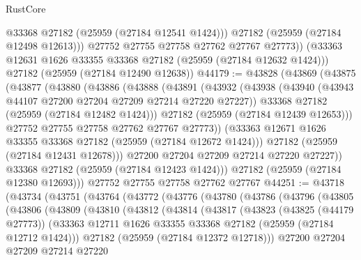 \begin{lexlean}{RustCore}
\begin{coremodule}
            @33368
            @27182
            (@25959 (@27184 @12541 @1424)))
          @27182
          (@25959 (@27184 @12498 @12613)))
        @27752
        @27755
        @27758
        @27762
        @27767
        @27773))
    (@33363 @12631 @1626 @33355 @33368 @27182 (@25959 (@27184 @12632 @1424)))
    @27182
    (@25959 (@27184 @12490 @12638))
@44179 := @43828
    (@43869
      (@43875
        (@43877
          (@43880
            (@43886
              (@43888
                (@43891
                  (@43932
                    (@43938
                      (@43940 (@43943 @44107 @27200 @27204 @27209 @27214 @27220 @27227))
                      @33368
                      @27182
                      (@25959 (@27184 @12482 @1424)))
                    @27182
                    (@25959 (@27184 @12439 @12653)))
                  @27752
                  @27755
                  @27758
                  @27762
                  @27767
                  @27773))
              (@33363 @12671 @1626 @33355 @33368 @27182 (@25959 (@27184 @12672 @1424)))
              @27182
              (@25959 (@27184 @12431 @12678)))
            @27200
            @27204
            @27209
            @27214
            @27220
            @27227))
        @33368
        @27182
        (@25959 (@27184 @12423 @1424)))
      @27182
      (@25959 (@27184 @12380 @12693)))
    @27752
    @27755
    @27758
    @27762
    @27767
@44251 := @43718
    (@43734
      (@43751
        (@43764
          (@43772
            (@43776
              (@43780
                (@43786
                  (@43796
                    (@43805
                      (@43806
                        (@43809
                          (@43810
                            (@43812
                              (@43814
                                (@43817
                                  (@43823
                                    (@43825 (@44179 @27773))
                                    (@33363
                                      @12711
                                      @1626
                                      @33355
                                      @33368
                                      @27182
                                      (@25959 (@27184 @12712 @1424)))
                                    @27182
                                    (@25959 (@27184 @12372 @12718)))
                                  @27200
                                  @27204
                                  @27209
                                  @27214
                                  @27220

\end{coremodule}
\end{lexlean}
